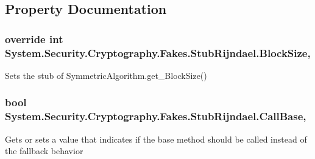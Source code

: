 \subsection{Property Documentation}
\hypertarget{class_system_1_1_security_1_1_cryptography_1_1_fakes_1_1_stub_rijndael_a4a7ce9f29e777b5feb557ca5172c02c1}{
\subsubsection[{Block\-Size}]{\setlength{\rightskip}{0pt plus 5cm}override int System.\-Security.\-Cryptography.\-Fakes.\-Stub\-Rijndael.\-Block\-Size\hspace{0.3cm}{\ttfamily [get]}, {\ttfamily [set]}}}\label{class_system_1_1_security_1_1_cryptography_1_1_fakes_1_1_stub_rijndael_a4a7ce9f29e777b5feb557ca5172c02c1}


Sets the stub of Symmetric\-Algorithm.\-get\-\_\-\-Block\-Size()

\hypertarget{class_system_1_1_security_1_1_cryptography_1_1_fakes_1_1_stub_rijndael_adea4040addd85dc7944381b24d56256b}{
\subsubsection[{Call\-Base}]{\setlength{\rightskip}{0pt plus 5cm}bool System.\-Security.\-Cryptography.\-Fakes.\-Stub\-Rijndael.\-Call\-Base\hspace{0.3cm}{\ttfamily [get]}, {\ttfamily [set]}}}\label{class_system_1_1_security_1_1_cryptography_1_1_fakes_1_1_stub_rijndael_adea4040addd85dc7944381b24d56256b}


Gets or sets a value that indicates if the base method should be called instead of the fallback behavior

